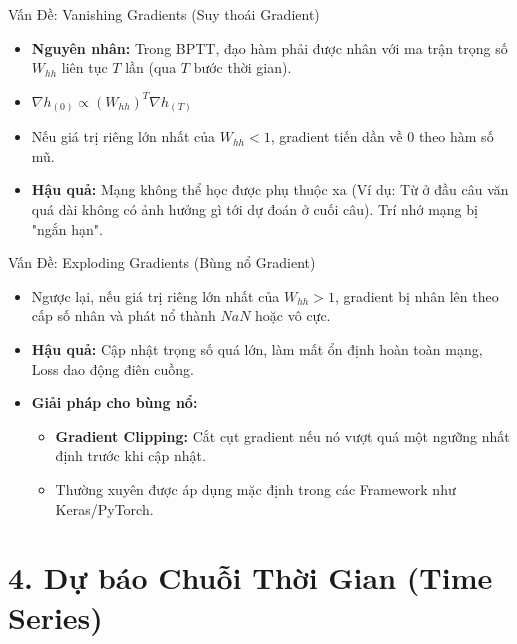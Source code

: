 \documentclass[aspectratio=169]{beamer}
\begin{document}
\begin{frame}{Vấn Đề: Vanishing Gradients (Suy thoái Gradient)}
    \begin{itemize}
        \item \textbf{Nguyên nhân:} Trong BPTT, đạo hàm phải được nhân với ma trận trọng số $W_{hh}$ liên tục $T$ lần (qua $T$ bước thời gian).
        \item $\nabla h_{(0)} \propto (W_{hh})^T \nabla h_{(T)}$
        \item Nếu giá trị riêng lớn nhất của $W_{hh} < 1$, gradient tiến dần về $0$ theo hàm số mũ.
        \item \textbf{Hậu quả:} Mạng không thể học được phụ thuộc xa (Ví dụ: Từ ở đầu câu văn quá dài không có ảnh hưởng gì tới dự đoán ở cuối câu). Trí nhớ mạng bị "ngắn hạn".
    \end{itemize}
\end{frame}

\begin{frame}{Vấn Đề: Exploding Gradients (Bùng nổ Gradient)}
    \begin{itemize}
        \item Ngược lại, nếu giá trị riêng lớn nhất của $W_{hh} > 1$, gradient bị nhân lên theo cấp số nhân và phát nổ thành $NaN$ hoặc vô cực.
        \item \textbf{Hậu quả:} Cập nhật trọng số quá lớn, làm mất ổn định hoàn toàn mạng, Loss dao động điên cuồng.
        \item \textbf{Giải pháp cho bùng nổ:}
        \begin{itemize}
            \item \textbf{Gradient Clipping:} Cắt cụt gradient nếu nó vượt quá một ngưỡng nhất định trước khi cập nhật.
            \item Thường xuyên được áp dụng mặc định trong các Framework như Keras/PyTorch.
        \end{itemize}
    \end{itemize}
\end{frame}

\section{4. Dự báo Chuỗi Thời Gian (Time Series)}
\end{document}
